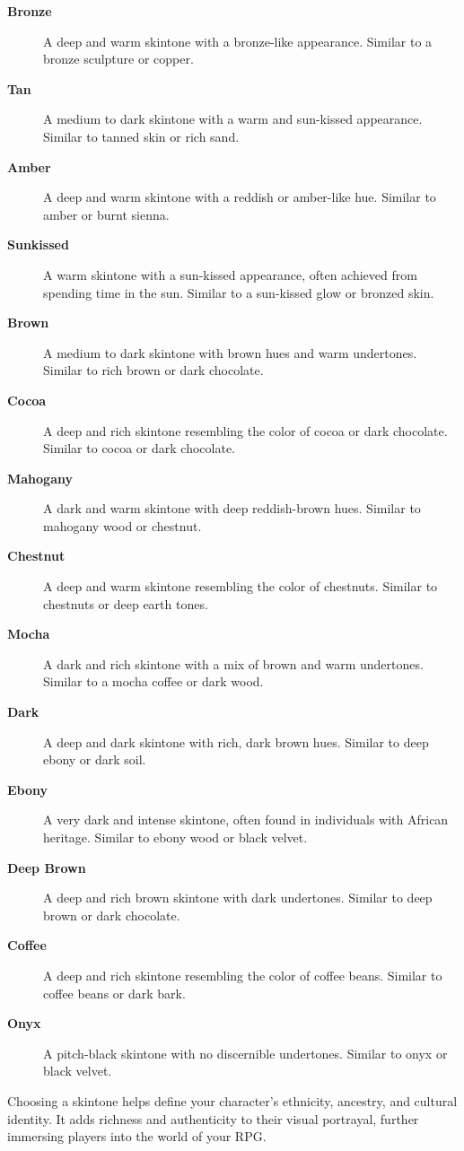 \documentclass[12pt]{book}  %
\begin{document}
\begin{description}
    \item[\textbf{Bronze}] A deep and warm skintone with a bronze-like appearance. Similar to a bronze sculpture or copper.
    \item[\textbf{Tan}] A medium to dark skintone with a warm and sun-kissed appearance. Similar to tanned skin or rich sand.
    \item[\textbf{Amber}] A deep and warm skintone with a reddish or amber-like hue. Similar to amber or burnt sienna.
    \item[\textbf{Sunkissed}] A warm skintone with a sun-kissed appearance, often achieved from spending time in the sun. Similar to a sun-kissed glow or bronzed skin.
    \item[\textbf{Brown}] A medium to dark skintone with brown hues and warm undertones. Similar to rich brown or dark chocolate.
    \item[\textbf{Cocoa}] A deep and rich skintone resembling the color of cocoa or dark chocolate. Similar to cocoa or dark chocolate.
    \item[\textbf{Mahogany}] A dark and warm skintone with deep reddish-brown hues. Similar to mahogany wood or chestnut.
    \item[\textbf{Chestnut}] A deep and warm skintone resembling the color of chestnuts. Similar to chestnuts or deep earth tones.
    \item[\textbf{Mocha}] A dark and rich skintone with a mix of brown and warm undertones. Similar to a mocha coffee or dark wood.
    \item[\textbf{Dark}] A deep and dark skintone with rich, dark brown hues. Similar to deep ebony or dark soil.
    \item[\textbf{Ebony}] A very dark and intense skintone, often found in individuals with African heritage. Similar to ebony wood or black velvet.
    \item[\textbf{Deep Brown}] A deep and rich brown skintone with dark undertones. Similar to deep brown or dark chocolate.
    \item[\textbf{Coffee}] A deep and rich skintone resembling the color of coffee beans. Similar to coffee beans or dark bark.
    \item[\textbf{Onyx}] A pitch-black skintone with no discernible undertones. Similar to onyx or black velvet.
\end{description}

Choosing a skintone helps define your character's ethnicity, ancestry, and cultural identity. It adds richness and authenticity to their visual portrayal, further immersing players into the world of your RPG.
\end{document}
